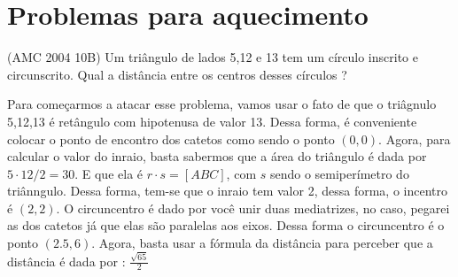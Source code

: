 \documentclass{article}
\begin{document}
\section{Problemas para aquecimento}
\begin{tcolorbox}[colback=blue!5!white,colframe=blue!75!black,title=Problema 1]
(AMC 2004 10B) Um triângulo de lados 5,12 e 13 tem um círculo inscrito e circunscrito. Qual a distância entre os centros desses círculos ?
\end{tcolorbox}
\begin{center}
\end{center}
Para começarmos a atacar esse problema, vamos usar o fato de que o triâgnulo 5,12,13 é retângulo com hipotenusa de valor 13. Dessa forma, é conveniente colocar o ponto de encontro dos catetos como sendo o ponto $(0,0)$. Agora, para calcular o valor do inraio, basta sabermos que a  área do triângulo é dada por $5 \cdot 12 / 2 = 30$. E que ela é $r \cdot s = [ABC]$, com $s$ sendo o semiperímetro do triânngulo. Dessa forma, tem-se que o inraio tem valor 2, dessa forma, o incentro é $(2,2)$. O circuncentro é dado por você unir duas mediatrizes, no caso, pegarei as dos catetos já que elas são paralelas aos eixos. Dessa forma o circuncentro é o ponto $(2.5, 6)$. Agora, basta usar a fórmula da distância para perceber que a distância é dada por : $\frac{\sqrt{65}}{2}$
\end{document}
